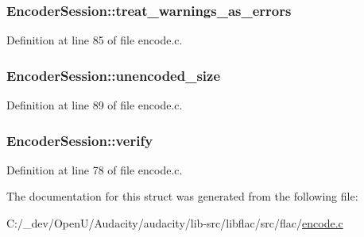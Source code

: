 \subsubsection[{\texorpdfstring{treat\+\_\+warnings\+\_\+as\+\_\+errors}{treat_warnings_as_errors}}]{ Encoder\+Session\+::treat\+\_\+warnings\+\_\+as\+\_\+errors}\hypertarget{struct_encoder_session_ace0c8d11735675f91661df55a751d985}{}\label{struct_encoder_session_ace0c8d11735675f91661df55a751d985}


Definition at line 85 of file encode.\+c.

\subsubsection[{\texorpdfstring{unencoded\+\_\+size}{unencoded_size}}]{ Encoder\+Session\+::unencoded\+\_\+size}\hypertarget{struct_encoder_session_adb61d728bf00fd7378da544237f2e6f8}{}\label{struct_encoder_session_adb61d728bf00fd7378da544237f2e6f8}


Definition at line 89 of file encode.\+c.

\subsubsection[{\texorpdfstring{verify}{verify}}]{ Encoder\+Session\+::verify}\hypertarget{struct_encoder_session_a127818d0d50f1d2c12fb6bed15c9eded}{}\label{struct_encoder_session_a127818d0d50f1d2c12fb6bed15c9eded}


Definition at line 78 of file encode.\+c.



The documentation for this struct was generated from the following file\+:\begin{DoxyCompactItemize}
\item 
C\+:/\+\_\+dev/\+Open\+U/\+Audacity/audacity/lib-\/src/libflac/src/flac/\hyperlink{libflac_2src_2flac_2encode_8c}{encode.\+c}\end{DoxyCompactItemize}
